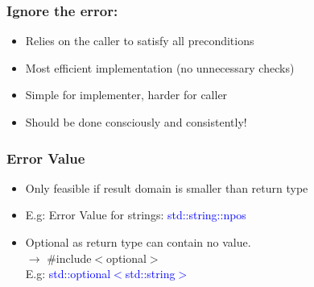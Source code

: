 \begin{minipage}{0.5\linewidth}
    \subsubsection{Ignore the error:}
    \begin{itemize}
        \item Relies on the caller to satisfy all preconditions
        \item Most efficient implementation (no unnecessary checks)
        \item Simple for implementer, harder for caller
        \item Should be done consciously and consistently!
    \end{itemize}
    \subsubsection{Error Value}
    \begin{itemize}
        \item Only feasible if result domain is smaller than return type
        \item E.g: Error Value for strings: \textcolor{blue}{std::string::npos}
        \item Optional as return type can contain no value. \\
            $\rightarrow$ \#include$<$optional$>$\\
            E.g: \textcolor{blue}{std::optional$<$std::string$>$}
    \end{itemize}
\end{minipage}
